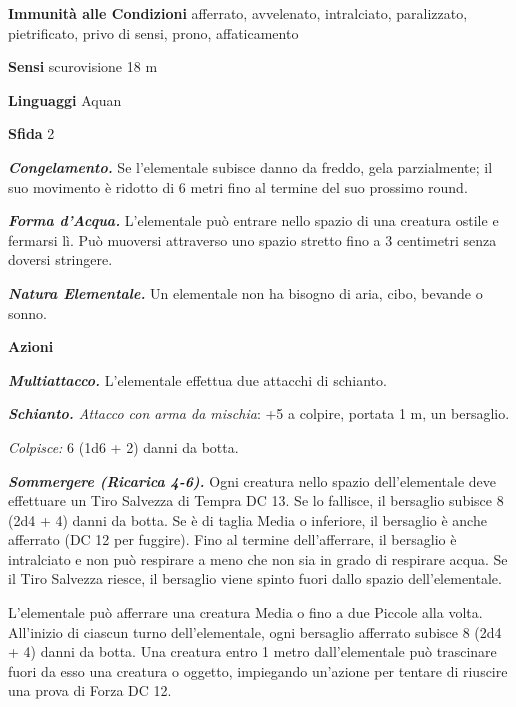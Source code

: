 \begin{multicols}{2}
\textbf{Immunità alle Condizioni} afferrato, avvelenato, intralciato, paralizzato, pietrificato, privo di sensi, prono, affaticamento

\textbf{Sensi} scurovisione 18 m

\textbf{Linguaggi} Aquan

\textbf{Sfida} 2

\textit{\textbf{Congelamento.}} Se l'elementale subisce danno da freddo, gela parzialmente; il suo movimento è ridotto di 6 metri fino al termine del suo prossimo round.

\textit{\textbf{Forma d'Acqua.}} L'elementale può entrare nello spazio di una creatura ostile e fermarsi lì. Può muoversi attraverso uno spazio stretto fino a 3 centimetri senza doversi stringere.

\textit{\textbf{Natura Elementale.}} Un elementale non ha bisogno di aria, cibo, bevande o sonno.

\textbf{Azioni}

\textit{\textbf{Multiattacco.}} L'elementale effettua due attacchi di schianto.

\textit{\textbf{Schianto.} Attacco con arma da mischia}: +5 a colpire, portata 1 m, un bersaglio.

\textit{Colpisce:} 6 (1d6 + 2) danni da botta.

\textit{\textbf{Sommergere (Ricarica 4-6).}} Ogni creatura nello spazio dell'elementale deve effettuare un Tiro Salvezza di Tempra DC 13. Se lo fallisce, il bersaglio subisce 8 (2d4 + 4) danni da botta. Se è di taglia Media o inferiore, il bersaglio è anche afferrato (DC 12 per fuggire). Fino al termine dell'afferrare, il bersaglio è intralciato e non può respirare a meno che non sia in grado di respirare acqua. Se il Tiro Salvezza riesce, il bersaglio viene spinto fuori dallo spazio dell'elementale.

L'elementale può afferrare una creatura Media o fino a due Piccole alla volta. All'inizio di ciascun turno dell'elementale, ogni bersaglio afferrato subisce 8 (2d4 + 4) danni da botta. Una creatura entro 1 metro dall'elementale può trascinare fuori da esso una creatura o oggetto, impiegando un'azione per tentare di riuscire una prova di Forza DC 12.


\end{multicols}
